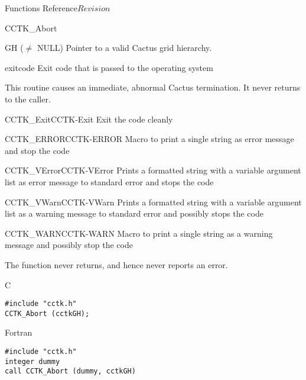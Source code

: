 \begin{cactuspart}{ Functions Reference}{}{$Revision$}
\begin{FunctionDescription}{CCTK\_Abort}
\begin{ParameterSection}
\begin{Parameter}{GH ($\ne$ NULL)}
Pointer to a valid Cactus grid hierarchy.
\end{Parameter}
\begin{Parameter}{exitcode}
Exit code that is passed to the operating system
\end{Parameter}
\end{ParameterSection}

\begin{Discussion}
This routine causes an immediate, abnormal Cactus termination.
It never returns to the caller.
\end{Discussion}

\begin{SeeAlsoSection}
\begin{SeeAlso2}{CCTK\_Exit}{CCTK-Exit}
Exit the code cleanly
\end{SeeAlso2}
\begin{SeeAlso2}{CCTK\_ERROR}{CCTK-ERROR}
Macro to print a single string as error message and stop the code
\end{SeeAlso2}
\begin{SeeAlso2}{CCTK\_VError}{CCTK-VError}
Prints a formatted string with a variable argument list as error
message to standard error and stops the code
\end{SeeAlso2}
\begin{SeeAlso2}{CCTK\_VWarn}{CCTK-VWarn}
Prints a formatted string with a variable argument list as a warning
message to standard error and possibly stops the code
\end{SeeAlso2}
\begin{SeeAlso2}{CCTK\_WARN}{CCTK-WARN}
Macro to print a single string as a warning message and possibly stop the code
\end{SeeAlso2}
\end{SeeAlsoSection}

\begin{ErrorSection}
\begin{Error}{}
The function never returns, and hence never reports an error.
\end{Error}
\end{ErrorSection}

\begin{ExampleSection}
\begin{Example}{C}
\begin{verbatim}
#include "cctk.h"
CCTK_Abort (cctkGH);
\end{verbatim}
\end{Example}
\begin{Example}{Fortran}
\begin{verbatim}
#include "cctk.h"
integer dummy
call CCTK_Abort (dummy, cctkGH)
\end{verbatim}
\end{Example}
\end{ExampleSection}
\end{FunctionDescription}




\end{cactuspart}
